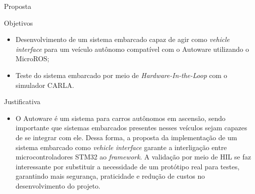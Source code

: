 \documentclass{if-beamer}
\begin{document}
\begin{frame}{Proposta}
	
	\begin{block}{Objetivos}
		
		\begin{itemize}
			\item Desenvolvimento de um sistema embarcado capaz de agir como \textit{vehicle interface} para um veículo autônomo compatível com o Autoware utilizando o MicroROS;
			\item Teste do sistema embarcado por meio de \textit{Hardware-In-the-Loop} com o simulador CARLA.
			
		\end{itemize}
		
	\end{block}
	
	\begin{block}{Justificativa}
	
	\begin{itemize}
		\item O Autoware é um sistema para carros autônomos em ascensão, sendo importante que sistemas embarcados presentes nesses veículos sejam capazes de se integrar com ele. Dessa forma, a proposta da implementação de um sistema embarcado como \textit{vehicle interface} garante a interligação entre microcontroladores STM32 ao \textit{framework}. A validação por meio de HIL se faz interessante por substituir a necessidade de um protótipo real para testes, garantindo mais segurança, praticidade e redução de custos no desenvolvimento do projeto.
		
	\end{itemize}
	
	\end{block}
	
\end{frame}
\end{document}
